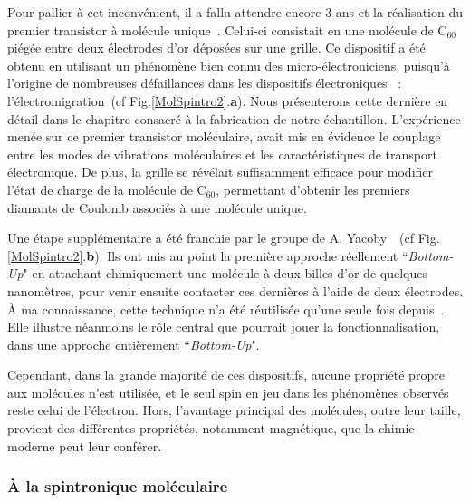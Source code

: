 Pour pallier à cet inconvénient, il a fallu attendre encore 3 ans et la réalisation du premier transistor à molécule unique~\cite{Park2000}. Celui-ci consistait en une molécule de C$_{60}$ piégée entre deux électrodes d'or déposées sur une grille. Ce dispositif a été obtenu en utilisant un phénomène bien connu des micro-électroniciens, puisqu'à l'origine de nombreuses défaillances dans les dispositifs électroniques~\cite{Ho1989,Tu1992} : l'électromigration~(cf Fig.\ref{MolSpintro2}.\textbf{a}). Nous présenterons cette dernière en détail dans le chapitre consacré à la fabrication de notre échantillon. 
L'expérience menée sur ce premier transistor moléculaire, avait mis en évidence le couplage entre les modes de vibrations moléculaires et les caractéristiques de transport électronique. De plus, la grille se révélait suffisamment efficace pour modifier l'état de charge de la molécule de C$_{60}$, permettant d'obtenir les premiers diamants de Coulomb associés à une molécule unique.

Une étape supplémentaire a été franchie par le groupe de A. Yacoby~\cite{Dadosh2005}~(cf Fig.\ref{MolSpintro2}.\textbf{b}). Ils ont mis au point la première approche réellement ``\textit{Bottom-Up}" en attachant chimiquement une molécule à deux billes d'or de quelques nanomètres, pour venir ensuite contacter ces dernières à l'aide de deux électrodes. \`A ma connaissance, cette technique n'a été réutilisée qu'une seule fois depuis~\cite{Jain2009}. Elle illustre néanmoins le rôle central que pourrait jouer la fonctionnalisation, dans une approche entièrement ``\textit{Bottom-Up}".

Cependant, dans la grande majorité de ces dispositifs, aucune propriété propre aux molécules n'est utilisée, et le seul spin en jeu dans les phénomènes observés reste celui de l'électron. Hors, l'avantage principal des molécules, outre leur taille, provient des différentes propriétés, notamment magnétique, que la chimie moderne peut leur conférer.

\subsubsection*{\`A la spintronique moléculaire}

